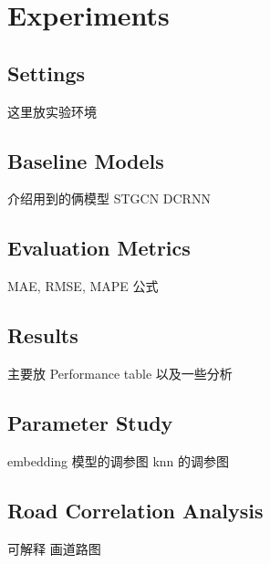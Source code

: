 
\section{Experiments}

\subsection{Settings}
这里放实验环境

\subsection{Baseline Models}
介绍用到的俩模型 STGCN DCRNN

\subsection{Evaluation Metrics}
MAE, RMSE, MAPE 公式

\subsection{Results}
主要放 Performance table
以及一些分析

\subsection{Parameter Study}
embedding 模型的调参图
knn 的调参图

\subsection{Road Correlation Analysis}
可解释
画道路图
